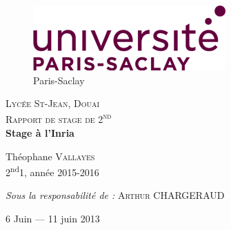 \documentclass{article}
\begin{document}
\begin{titlepage}
\begin{center}
\begin{figure}[!tbp]
				\hfill
				\begin{minipage}[b]{0.3\linewidth}
					\includegraphics[width=\textwidth]{logo_0.png}
					\caption{Paris-Saclay}
				\end{minipage}
			\end{figure}
			
			\textsc{\LARGE Lycée St-Jean, Douai }\\[2cm]
			
			\textsc{\Large Rapport de stage de 2\textsuperscript{nd}}\\[1.5cm]
			
			{ \huge \bfseries Stage à l'Inria\\[0.4cm] }
			
			
			\begin{minipage}{0.4\textwidth}
				\begin{flushleft} \large
					Théophane \textsc{Vallayes}\\
					2\textsuperscript{nd}1, année 2015-2016\\
				\end{flushleft}
			\end{minipage}
			\begin{minipage}{0.4\textwidth}
				\begin{flushright} \large
					\emph{Sous la responsabilité de :} \textsc{Arthur CHARGERAUD}
				\end{flushright}
			\end{minipage}
			
			\vfill
			
			{\large 6 Juin — 11 juin 2013}
			
		\end{center}
\end{titlepage}

\maketitle
\tableofcontents
\end{document}
